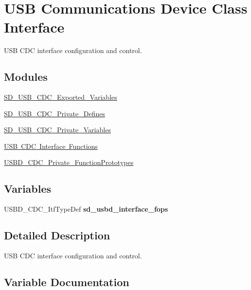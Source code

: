 \hypertarget{group___s_d___u_s_b___c_d_c}{}\section{U\+SB Communications Device Class Interface}
\label{group___s_d___u_s_b___c_d_c}


U\+SB C\+DC interface configuration and control.  


\subsection*{Modules}
\begin{DoxyCompactItemize}
\item 
\mbox{\hyperlink{group___s_d___u_s_b___c_d_c___exported___variables}{S\+D\+\_\+\+U\+S\+B\+\_\+\+C\+D\+C\+\_\+\+Exported\+\_\+\+Variables}}
\item 
\mbox{\hyperlink{group___s_d___u_s_b___c_d_c___private___defines}{S\+D\+\_\+\+U\+S\+B\+\_\+\+C\+D\+C\+\_\+\+Private\+\_\+\+Defines}}
\item 
\mbox{\hyperlink{group___s_d___u_s_b___c_d_c___private___variables}{S\+D\+\_\+\+U\+S\+B\+\_\+\+C\+D\+C\+\_\+\+Private\+\_\+\+Variables}}
\item 
\mbox{\hyperlink{group___s_d___u_s_b___c_d_c___i_f___functions}{U\+S\+B C\+D\+C Interface Functions}}
\item 
\mbox{\hyperlink{group___u_s_b_d___c_d_c___private___function_prototypes}{U\+S\+B\+D\+\_\+\+C\+D\+C\+\_\+\+Private\+\_\+\+Function\+Prototypes}}
\end{DoxyCompactItemize}
\subsection*{Variables}
\begin{DoxyCompactItemize}
\item 
U\+S\+B\+D\+\_\+\+C\+D\+C\+\_\+\+Itf\+Type\+Def {\bfseries sd\+\_\+usbd\+\_\+interface\+\_\+fops}
\end{DoxyCompactItemize}


\subsection{Detailed Description}
U\+SB C\+DC interface configuration and control. 



\subsection{Variable Documentation}
\mbox{\label{group___s_d___u_s_b___c_d_c_ga4f508ab451d147ae04f1704d305c53f2}} 

